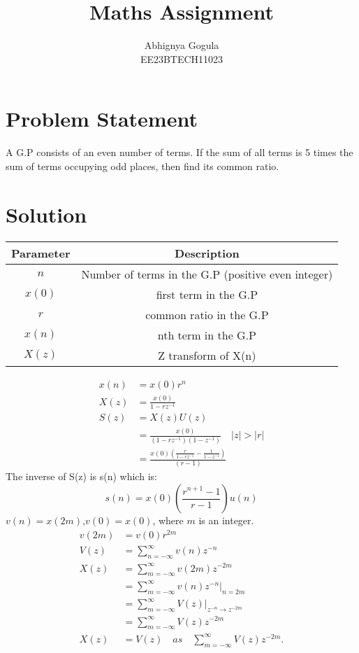 \documentclass{article}
\begin{document}
\title{Maths Assignment}
\author{Abhignya Gogula\\
        EE23BTECH11023}
\maketitle
\section*{Problem Statement}
A G.P consists of an even number of terms. If the sum of all terms is 5 times the sum of terms occupying odd places, then find its common ratio.
\section*{Solution}
\begin{table}[h!]
\centering
\begin{tabular}{|c|c|}
\hline
Parameter & Description \\
\hline
\( n \) & Number of terms in the G.P (positive even integer) \\
\hline
\(x(0) \) & first term in the G.P \\
\hline
\( r \) & common ratio in the G.P \\
\hline
\( x(n) \) & nth term in the G.P \\
\hline
\( X(z) \) & Z transform of X(n) \\
\hline
\end{tabular}
\end{table}
\begin{align}
x(n) &= x(0)r^n \\
X(z) &= \frac{x(0)}{1-rz^{-1}} \\
S(z) &= X(z)U(z) \\
     &= \frac{x(0)}{(1-rz^{-1})(1-z^{-1})} \quad \lvert z \rvert > \lvert r \rvert \\
     &= \frac{x(0)(\frac{r}{1-rz^{-1}}-\frac{1}{1-z^{-1}})}{(r-1)}
\end{align}
The inverse of S(z) is s(n) which is:
\begin{equation}
s(n) = x(0)(\frac{r^{n+1}-1}{r-1})u(n)
\label{eq:eq1}
\end{equation}
\(v(n)=x(2m)\),\(v(0)=x(0)\), where \(m\) is an integer.\\
\begin{align}
v(2m)&=v(0)r^{2m}\\
V(z) & = \sum_{n=-\infty}^{\infty} v(n)z^{-n} \\
X(z) & = \sum_{m=-\infty}^{\infty} v(2m)z^{-2m} \\
     & = \sum_{m=-\infty}^{\infty} v(n)z^{-n} \Bigg|_{n=2m} \\
     & = \sum_{m=-\infty}^{\infty} V(z) \Bigg|_{z^{-n} \rightarrow z^{-2m}} \\
     & = \sum_{m=-\infty}^{\infty} V(z)z^{-2m}\\
X(z) &= V(z) \quad as \quad \sum_{m=-\infty}^{\infty} V(z)z^{-2m}.
\end{align}
\end{document}
